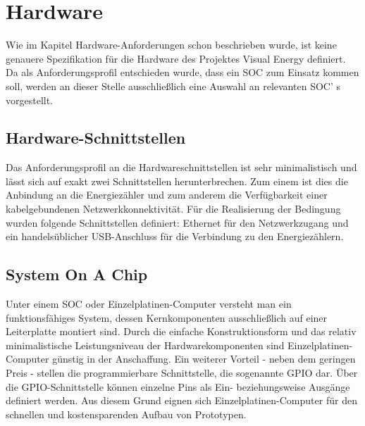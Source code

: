 \documentclass[../Bachelorarbeit.tex]{subfiles}
\begin{document}
\begin{comment}
\section{Übersicht der Technologien}

Das Ziel dieses Kapitel ist es, die für das Projekt relevanten Technologien vorzustellen, die sich durch die State of the Art – Recherche heraus kristallisiert haben. 
Diese bilden die Grundlage für die Auswahl der Technologien, die schlussendlich im Projekt eingesetzt werden.
\end{comment}


\section{Hardware}
Wie im Kapitel Hardware-Anforderungen schon beschrieben wurde, ist keine genauere Spezifikation für die Hardware des Projektes Visual Energy definiert. 
Da als Anforderungsprofil entschieden wurde, dass ein \acs{SOC} zum Einsatz kommen soll, werden an dieser Stelle ausschließlich eine Auswahl an relevanten \acs{SOC}' s vorgestellt.

\subsection{Hardware-Schnittstellen}
Das Anforderungsprofil an die Hardwareschnittstellen ist sehr minimalistisch und lässt sich
auf exakt zwei Schnittstellen herunterbrechen. Zum einem ist dies die Anbindung an die 
Energiezähler und zum anderem die Verfügbarkeit einer kabelgebundenen 
Netzwerkkonnektivität. Für die Realisierung der Bedingung wurden folgende Schnittstellen
definiert: Ethernet für den Netzwerkzugang und ein handelsüblicher USB-Anschluss für die
Verbindung zu den Energiezählern.

\subsection{System On A Chip}
\label{subsubsec:system_on_a_chip}
Unter einem \ac{SOC} oder Einzelplatinen-Computer versteht man ein funktionsfähiges System, dessen Kernkomponenten ausschließlich auf einer Leiterplatte montiert sind. 
Durch die einfache Konstruktionsform und das relativ minimalistische Leistungsniveau der Hardwarekomponenten sind Einzelplatinen-Computer günstig in der Anschaffung. 
Ein weiterer Vorteil - neben dem geringen Preis - stellen die programmierbare Schnittstelle, die sogenannte \acf{GPIO} dar. 
Über die \ac{GPIO}-Schnittstelle können einzelne Pins als Ein- beziehungsweise Ausgänge definiert werden. 
Aus diesem Grund eignen sich Einzelplatinen-Computer für den schnellen und kostensparenden Aufbau von Prototypen.
\end{document}
